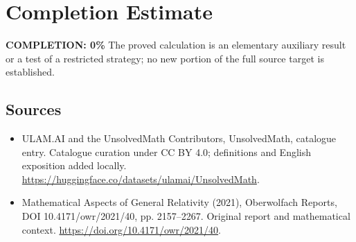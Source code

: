 \documentclass[11pt]{article}
\begin{document}
\section{Completion Estimate}
\noindent\textbf{COMPLETION: 0\%}
The proved calculation is an elementary auxiliary result or a test of a restricted strategy; no new portion of the full source target is established.

\subsection{Sources}
\begin{itemize}
\item[\hypertarget{source:statement:1}{S1}] ULAM.AI and the UnsolvedMath Contributors, UnsolvedMath, catalogue entry. Catalogue curation under CC BY 4.0; definitions and English exposition added locally.
\url{https://huggingface.co/datasets/ulamai/UnsolvedMath}.
\item[\hypertarget{source:statement:2}{S2}] Mathematical Aspects of General Relativity (2021), Oberwolfach Reports, DOI 10.4171/owr/2021/40, pp. 2157--2267. Original report and mathematical context.
\url{https://doi.org/10.4171/owr/2021/40}.
\end{itemize}
\label{end:statement}
\end{document}
